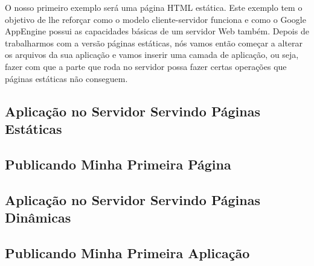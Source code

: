 \documentclass[a4paper]{article}
\begin{document}
O nosso primeiro exemplo será uma página HTML estática. Este exemplo tem o objetivo de lhe reforçar como o modelo cliente-servidor funciona e como o Google AppEngine possui as capacidades básicas de um servidor Web também. Depois de trabalharmos com a versão páginas estáticas, nós vamos então começar a alterar os arquivos da sua aplicação e vamos inserir uma camada de aplicação, ou seja, fazer com que a parte que roda no servidor possa fazer certas operações que páginas estáticas não conseguem. 

\subsection {Aplicação no Servidor Servindo Páginas Estáticas} 


\subsection { Publicando Minha Primeira Página } 


\subsection {Aplicação no Servidor Servindo Páginas Dinâmicas} 


\subsection { Publicando Minha Primeira Aplicação } 


\printindex
\end{document}
